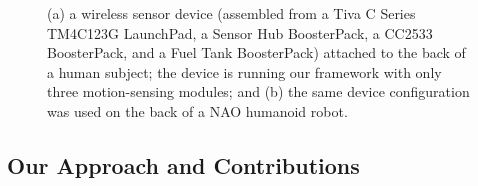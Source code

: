 \documentclass[]{IEEEtran}
\begin{document}



\begin{figure}[htb]
\centering
{}
\qquad
{} 
\caption{(a) a wireless sensor device (assembled from a Tiva C Series  TM4C123G 
LaunchPad, a Sensor Hub BoosterPack, a CC2533 BoosterPack, and a Fuel Tank BoosterPack) 
attached to the back of a human subject; the device is running our framework  with only 
three motion-sensing modules; and (b) the 
same device configuration was used on the back of a NAO humanoid robot\cite{abeyruwanFlairs2015}.}
 \label{fig:deviceWithSubjects}
\end{figure}

\subsection{Our Approach and Contributions}
\end{document}

